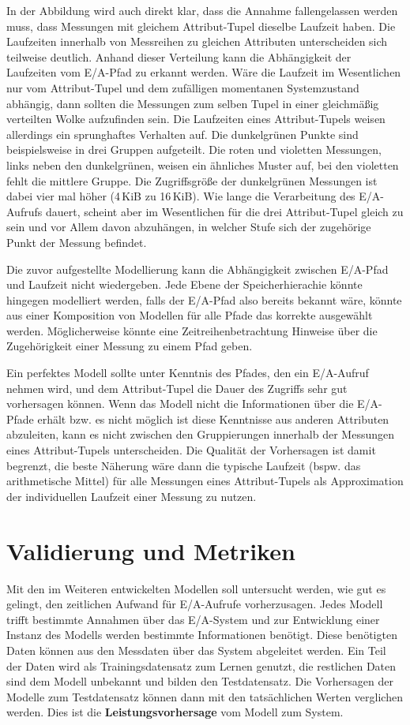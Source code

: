 \documentclass[
	twoside,
	12pt,
	a4paper,
	BCOR10mm,
	DIV14,
	listof=totoc,
	bibliography=totoc,
	headsepline
]{scrreprt}
\begin{document}
In der Abbildung wird auch direkt klar, dass die Annahme fallengelassen werden muss, dass Messungen mit gleichem Attribut-Tupel dieselbe Laufzeit haben. Die Laufzeiten innerhalb von Messreihen zu gleichen Attributen unterscheiden sich teilweise deutlich.
Anhand dieser Verteilung kann die Abhängigkeit der Laufzeiten vom E/A-Pfad zu erkannt werden.
Wäre die Laufzeit im Wesentlichen nur vom Attribut-Tupel und dem \glqq zufälligen\grqq{} momentanen Systemzustand abhängig, dann sollten die Messungen zum selben Tupel in einer gleichmäßig verteilten Wolke aufzufinden sein.
Die Laufzeiten eines Attribut-Tupels weisen allerdings ein sprunghaftes Verhalten auf. Die dunkelgrünen Punkte sind beispielsweise in drei Gruppen aufgeteilt.
Die roten und violetten Messungen, links neben den dunkelgrünen, weisen ein ähnliches Muster auf, bei den violetten fehlt die mittlere Gruppe.
Die Zugriffsgröße der dunkelgrünen Messungen ist dabei vier mal höher (4\,KiB zu 16\,KiB).
Wie lange die Verarbeitung des E/A-Aufrufs dauert, scheint aber im Wesentlichen für die drei Attribut-Tupel gleich zu sein und vor Allem davon abzuhängen, in welcher Stufe sich der zugehörige Punkt der Messung befindet.\medskip

Die zuvor aufgestellte Modellierung kann die Abhängigkeit zwischen E/A-Pfad und Laufzeit nicht wiedergeben.
Jede Ebene der Speicherhierachie könnte hingegen modelliert werden, falls der E/A-Pfad also bereits bekannt wäre, könnte aus einer Komposition von Modellen für alle Pfade das korrekte ausgewählt werden.
Möglicherweise könnte eine Zeitreihenbetrachtung Hinweise über die Zugehörigkeit einer Messung zu einem Pfad geben. 

Ein perfektes Modell sollte unter Kenntnis des Pfades, den ein E/A-Aufruf nehmen wird, und dem Attribut-Tupel die Dauer des Zugriffs sehr gut vorhersagen können. Wenn das Modell nicht die Informationen über die E/A-Pfade erhält bzw. es nicht möglich ist  diese Kenntnisse aus anderen Attributen abzuleiten, kann es nicht zwischen den Gruppierungen innerhalb der Messungen eines Attribut-Tupels unterscheiden. Die Qualität der Vorhersagen ist damit begrenzt, die beste Näherung wäre dann die typische Laufzeit (bspw. das arithmetische Mittel) für alle Messungen eines Attribut-Tupels als Approximation der individuellen Laufzeit einer Messung zu nutzen.

\section{Validierung und Metriken}
\label{analyse:valid}
Mit den im Weiteren entwickelten Modellen soll untersucht werden, wie gut es gelingt, den zeitlichen Aufwand für E/A-Aufrufe vorherzusagen. 
Jedes Modell trifft bestimmte Annahmen über das E/A-System und zur Entwicklung einer Instanz des Modells werden bestimmte Informationen benötigt.
Diese benötigten Daten können aus den Messdaten über das System abgeleitet werden.
Ein Teil der Daten wird als Trainingsdatensatz zum Lernen genutzt, die restlichen Daten sind dem Modell unbekannt und bilden den Testdatensatz. Die Vorhersagen der Modelle zum Testdatensatz können dann mit den tatsächlichen Werten verglichen werden. Dies ist die \textbf{Leistungsvorhersage} vom Modell zum System. \medskip
\end{document}
